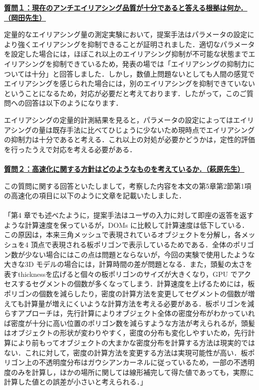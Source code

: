 \documentclass[a4j,10pt]{jsarticle}
\begin{document}
\newpage
\noindent
\textbf{\underline{質問１：現在のアンチエイリアシング品質が十分であると答える根拠は何か．（岡田先生）}}\par
定量的なエイリアシング量の測定実験において，提案手法はパラメータの設定により強くエイリアシングを抑制できることが証明されました．適切なパラメータを設定した場合には，ほぼこれ以上のエイリアシング抑制が不可能な状態までエイリアシングを抑制できているため，発表の場では「エイリアシングの抑制力については十分」と回答しました．しかし，数値上問題ないとしても人間の感覚でエイリアシングを感じられた場合には，別のエイリアシングを抑制できていないということになるため，対応が必要だと考えております．したがって，このご質問への回答は以下のようになります．\par
エイリアシングの定量的計測結果を見ると，パラメータの設定によってはエイリアシングの量は既存手法に比べてひじょうに少ないため現時点でエイリアシングの抑制力は十分であると考える．これ以上の対処が必要かどうかは，定性的評価を行ったうえで対応を考える必要がある．\\
\\
\textbf{\underline{質問２：高速化に関する方針はどのようなものを考えているか．（萩原先生）}}\par
この質問に関する回答といたしまして，考察した内容を本文の第5章第2節第1項の高速化の項目に以下のように文章を記載いたしました．\\
\\
「第4 章でも述べたように，提案手法はユーザの入力に対して即座の返答を返すような計算速度を保っているが，DOMs に比較して計算速度は低下している．この原因は，本来三角メッシュで表現されているオブジェクトを分解し，各メッシュを4 頂点で表現される板ポリゴンで表示しているためである．全体のポリゴン数が少ない場合にはこの点は問題とならないが，今回の実験で使用したような大きな3D モデルの場合には，計算時間の差が問題となる．また，頭髪の太さを表すthicknessを広げると個々の板ポリゴンのサイズが大きくなり，GPU でアクセスするセグメントの個数が多くなってしまう．計算速度を上げるためには，板ポリゴンの個数を減らしたり，密度の計算方法を変更してセグメントの個数が増えても計算量が増えにくいような計算方法を考える必要がある．板ポリゴンを減らすアプローチは，先行計算によりオブジェクト全体の密度分布がわかっていれば密度が十分に高い位置のポリゴン数を減らすような方法が考えられるが，頭髪はオブジェクトの形状が変わりやすく，密度の分布も変化しやすいため，先行計算により前もってオブジェクトの大まかな密度分布を計算する方法は現実的ではない．これに対して，密度の計算方法を変更する方法は実現可能性が高い．板ポリゴン上の不透明度分布はガウシアンカーネルに従っているため，一部の不透明度のみを計算し，ほかの場所に関しては線形補完して得た値であっても，実際に計算した値との誤差が小さいと考えられる．」\\
\end{document}
